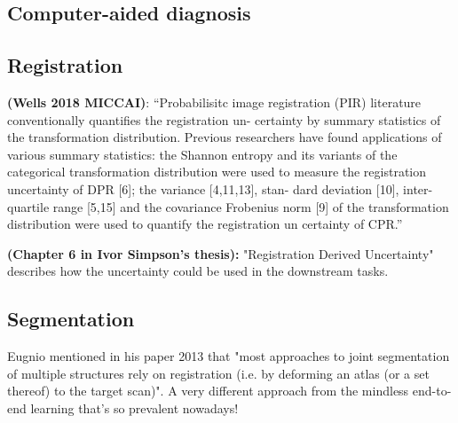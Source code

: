  
 
 
 

\subsection{Computer-aided diagnosis}

\subsection{Registration}
\textbf{(Wells 2018 MICCAI)}: ``Probabilisitc image registration (PIR) literature conventionally quantifies the registration un- certainty by summary statistics of the transformation distribution. Previous researchers have found applications of various summary statistics: the Shannon entropy and its variants of the categorical transformation distribution were used to measure the registration uncertainty of DPR [6]; the variance [4,11,13], stan- dard deviation [10], inter-quartile range [5,15] and the covariance Frobenius norm [9] of the transformation distribution were used to quantify the registration un	certainty of CPR.''

\textbf{(Chapter 6 in Ivor Simpson's thesis):} "Registration Derived Uncertainty" describes how the uncertainty could be used in the downstream tasks. 

\subsection{Segmentation}
Eugnio mentioned in his paper 2013 \cite{iglesias2011combining} that "most approaches to joint segmentation of multiple structures rely on registration (i.e. by deforming an atlas (or a set thereof) to the target scan)". A very different approach from the mindless end-to-end learning that's so prevalent nowadays!  

